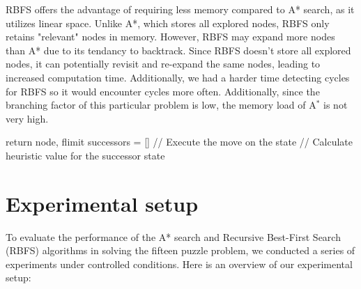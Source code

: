 \documentclass{article}
\begin{document}
RBFS offers the advantage of requiring less memory compared to A* search, as it utilizes linear space. Unlike A*, which stores all explored nodes, RBFS only retains "relevant" nodes in memory. However, RBFS may expand more nodes than A* due to its tendancy to backtrack. Since RBFS doesn't store all explored nodes, it can potentially revisit and re-expand the same nodes, leading to increased computation time. Additionally, we had a harder time detecting cycles for RBFS so it would encounter cycles more often. Additionally, since the branching factor of this particular problem is low, the memory load of A$^*$ is not very high.
\begin{algorithm}
   
  \State return node, flimit
        \EndIf
        \State successors = []
             // Execute the move on the state
             // Calculate heuristic value for the successor state
            \EndIf
            \EndFor
        \EndIf

            \EndIf
            \EndIf
            \EndWhile
  \label{alg:RBFS}
\end{algorithm}

\section{Experimental setup}

To evaluate the performance of the A* search and Recursive Best-First Search (RBFS) algorithms in solving the fifteen puzzle problem, we conducted a series of experiments under controlled conditions. Here is an overview of our experimental setup:
\end{document}
